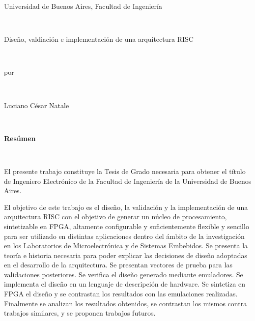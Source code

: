 \newpage
\thispagestyle{empty}
\begin{center} 
		
		Universidad de Buenos Aires, Facultad de Ingeniería

\

Diseño, valdiación e implementación de una arquitectura RISC

\

por

\

Luciano César Natale

\

\textbf{Resúmen}

\

\end{center}

El presente trabajo constituye la Tesis de Grado necesaria para obtener el título de Ingeniero Electrónico de la Facultad de Ingeniería de la Universidad de Buenos Aires.

El objetivo de este trabajo es el diseño, la validación y la implementación de una arquitectura RISC con el objetivo de generar un núcleo de procesamiento, sintetizable en FPGA, altamente configurable y suficientemente flexible y sencillo para ser utilizado en distintas aplicaciones dentro del ámbito de la investigación  en los Laboratorios de Microelectrónica y de Sistemas Embebidos. Se presenta la teoría e historia necesaria para poder explicar las decisiones de diseño adoptadas en el desarrollo de la arquitectura. Se presentan vectores de prueba para las validaciones posteriores. Se verifica el diseño generado mediante emuladores. Se implementa el diseño en un lenguaje de descripción de hardware. Se sintetiza en FPGA el diseño y se contrastan los resultados con las emulaciones realizadas. Finalmente se analizan los resultados obtenidos, se contrastan los mismos contra trabajos similares, y se proponen trabajos futuros.